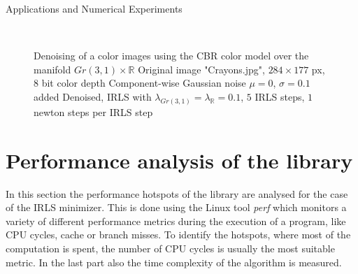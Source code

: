 \begin{chapter}{Applications and Numerical Experiments}
\begin{figure}[h!]
    \centering
    \\
    \caption[Large image "crayons" CBR-vectorial denoising]{Denoising of a color images using the CBR color model over the manifold $Gr(3,1)\times\mathbb{R}$
	 Original image "Crayons.jpg", $284\times 177$ px, 8 bit color depth
	 Component-wise Gaussian noise $\mu=0$, $\sigma=0.1$ added
	 Denoised, IRLS with $\lambda_{Gr(3,1)}=\lambda_{\mathbb{R}}=0.1$, $5$ IRLS steps, $1$ newton steps per IRLS step
	\label{fig:application_grassmann2}
    }
\end{figure}



\FloatBarrier
\section{Performance analysis of the library} %
\label{sec:Performance analysis of the library}
In this section the performance hotspots of the library are analysed for the case of the IRLS minimizer. This is done using the Linux tool \emph{perf} which monitors a variety of different
performance metrics during the execution of a program, like CPU cycles, cache or branch misses. To identify the hotspots, where most of the computation is spent, the number of CPU cycles is
usually the most suitable metric. In the last part also the time complexity of the algorithm is measured.\\


\end{chapter}
